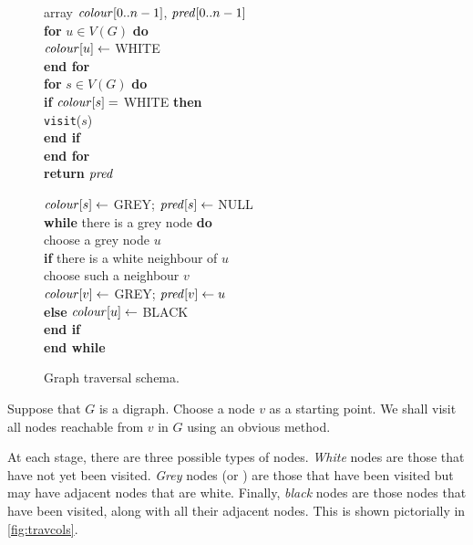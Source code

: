 \begin{figure}[htbp]
\hspace*{1in}\begin{minipage}{5in}
{
\> array $\operatorname{\text{\textit{colour}}}[0..n-1]$, $\operatorname{\text{\textit{pred}}}[0..n-1]$ \\
\> \textbf{for} $u \in V(G)$ \textbf{do} \\
\> \> $\operatorname{\text{\textit{colour}}}[u] \gets $ WHITE \\
\> \textbf{end for}\\
\> \textbf{for}  $s\in V(G)$ \textbf{do} \\
\> \> \textbf{if} $\operatorname{\text{\textit{colour}}}[s] = $ WHITE \textbf{then} \\
\> \> \> \texttt{visit}($s$) \\
\> \> \textbf{end if}\\
\> \textbf{end for}\\
\> \textbf{return} $\operatorname{\text{\textit{pred}}}$ \\
}

{
\> $\operatorname{\text{\textit{colour}}}[s] \gets $ GREY; $\operatorname{\text{\textit{pred}}}[s] \gets $ NULL \\
\> \textbf{while} there is a grey node \textbf{do} \\
\> \> choose a grey node $u$ \\
\> \> \textbf{if} there is a white neighbour of $u$  \\
\> \> \> choose such a neighbour $v$ \\
\> \> \> $\operatorname{\text{\textit{colour}}}[v] \gets $ GREY; $\operatorname{\text{\textit{pred}}}[v] \gets u$ \\
\> \> \textbf{else} $\operatorname{\text{\textit{colour}}}[u] \gets $ BLACK \\
\> \> \textbf{end if} \\
\> \textbf{end while}\\
}
\end{minipage}
\caption{Graph traversal schema.}
\label{fig:travcode}
\end{figure}


Suppose that $G$ is a digraph. Choose a node $v$ as a starting point. We
shall visit all nodes reachable from $v$ in $G$ using an obvious method.

At each stage, there are three possible types of nodes. \emph{White}
nodes are those that have not yet been visited. \emph{Grey} nodes 
(or ) are those that have been visited but may have 
adjacent nodes that are white.
Finally, \emph{black} nodes are those  nodes that have been
visited, along with all their adjacent nodes. This is shown pictorially
in \cref{fig:travcols}.

